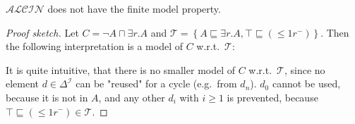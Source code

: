 \begin{theorem}
	$\mathcal{ALCIN}$ does not have the finite model property.
\end{theorem}
\begin{proof}[Proof sketch]
	Let $C = \neg A \sqcap \exists r.A$ and $\mathcal{T} = \left\{ A \sqsubseteq \exists r.A, \top \sqsubseteq ( \leq 1r^-) \right\}$.
	Then the following interpretation is a model of $C$ w.r.t.\ $\mathcal{T}$:
	\begin{figure}[H]
		\centering
		\caption{}
		\label{}
	\end{figure}
	It is quite intuitive, that there is no smaller model of $C$ w.r.t.\ $\mathcal{T}$,
	since no element $d \in \Delta^{\mathcal{I}}$ can be "reused" for a cycle (e.g.\ from $d_n$).
	$d_0$ cannot be used, because it is not in $A$, and any other $d_i$ with $i \geq 1$ is prevented, because $\top \sqsubseteq ( \leq 1r^-) \in  \mathcal{T}$.
\end{proof}

\newpage
